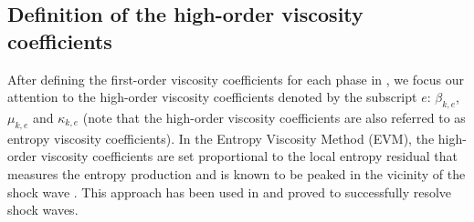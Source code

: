 \documentclass[preprint,10pt]{elsarticle}
\begin{document}
\subsection{Definition of the high-order viscosity coefficients}\label{sec:visc-coeff-ho}
%
After defining the first-order viscosity coefficients for each phase in , we focus our attention to the high-order viscosity coefficients denoted by the subscript $e$: $\beta_{k,e}$, $\mu_{k,e}$ and $\kappa_{k,e}$ (note that the high-order viscosity coefficients are also referred to as entropy viscosity coefficients). In the Entropy Viscosity Method (EVM), the high-order viscosity coefficients are set proportional to the local entropy residual that measures the entropy production and is known to be peaked in the vicinity of the shock wave \cite{Leveque}. This approach has been used in \cite{jlg1, jlg2, jlg3} and proved to successfully resolve shock waves. 
\end{document}
